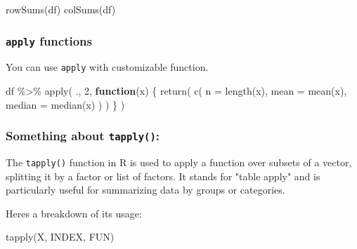\documentclass[
]{article}
\newenvironment{Shaded}{}{}
\newcommand{\AttributeTok}[1]{\textcolor[rgb]{0.49,0.56,0.16}{#1}}
\newcommand{\ControlFlowTok}[1]{\textcolor[rgb]{0.00,0.44,0.13}{\textbf{#1}}}
\newcommand{\DecValTok}[1]{\textcolor[rgb]{0.25,0.63,0.44}{#1}}
\newcommand{\FunctionTok}[1]{\textcolor[rgb]{0.02,0.16,0.49}{#1}}
\newcommand{\NormalTok}[1]{#1}
\newcommand{\SpecialCharTok}[1]{\textcolor[rgb]{0.25,0.44,0.63}{#1}}
\begin{document}
\begin{Shaded}
\begin{Highlighting}[]
\FunctionTok{rowSums}\NormalTok{(df)}
\FunctionTok{colSums}\NormalTok{(df)}
\end{Highlighting}
\end{Shaded}

\hypertarget{apply-functions}{%
\subsubsection{\texorpdfstring{\texttt{apply}
functions}{apply functions}}\label{apply-functions}}

You can use \texttt{apply} with customizable function.

\begin{Shaded}
\begin{Highlighting}[]
\NormalTok{df }\SpecialCharTok{\%\textgreater{}\%} \FunctionTok{apply}\NormalTok{(}
\NormalTok{  ., }
  \DecValTok{2}\NormalTok{, }
  \ControlFlowTok{function}\NormalTok{(x) \{ }
    \FunctionTok{return}\NormalTok{(}
      \FunctionTok{c}\NormalTok{(}
        \AttributeTok{n =} \FunctionTok{length}\NormalTok{(x), }
        \AttributeTok{mean =} \FunctionTok{mean}\NormalTok{(x), }
        \AttributeTok{median =} \FunctionTok{median}\NormalTok{(x) }
\NormalTok{      )}
\NormalTok{    )}
\NormalTok{  \} }
\NormalTok{)}
\end{Highlighting}
\end{Shaded}

\hypertarget{something-about-tapply}{%
\subsubsection{\texorpdfstring{Something about
\texttt{tapply()}:}{Something about tapply():}}\label{something-about-tapply}}

The \texttt{tapply()} function in R is used to apply a function over
subsets of a vector, splitting it by a factor or list of factors. It
stands for "table apply" and is particularly useful for summarizing data
by groups or categories.

Here\textquotesingle s a breakdown of its usage:

\begin{Shaded}
\begin{Highlighting}[]
\FunctionTok{tapply}\NormalTok{(X, INDEX, FUN)}
\end{Highlighting}
\end{Shaded}
\end{document}
